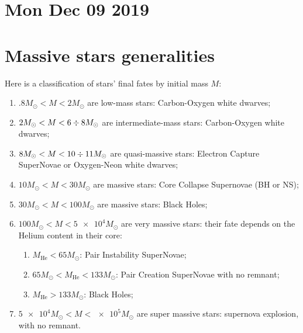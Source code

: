 \documentclass[main.tex]{subfiles}
\begin{document}
\section*{Mon Dec 09 2019}

\section{Massive stars generalities}


Here is a classification of stars' final fates by initial mass \(M\): 
\begin{enumerate}
    \item \(\num{.8} M_{\odot} < M < \num{2} M_{\odot}\) are low-mass stars: Carbon-Oxygen white dwarves;
    \item \(\num{2} M_{\odot} < M < 6 \divisionsymbol 8 M_{\odot}\) are intermediate-mass stars: Carbon-Oxygen white dwarves;
    \item \(\num{8} M_{\odot} < M < 10 \divisionsymbol 11 M_{\odot}\) are quasi-massive stars: Electron Capture SuperNovae or Oxygen-Neon white dwarves;
    \item \(10 M_{\odot} < M < 30 M_{\odot}\) are massive stars: Core Collapse Supernovae (BH or NS);
    \item \(30 M_{\odot} < M < 100 M_{\odot}\) are massive stars: Black Holes;
    \item \(100 M_{\odot} < M < \num{5e4} M_{\odot}\) are very massive stars: their fate depends on the Helium content in their core: \begin{enumerate}
        \item \(M _{\text{He}} < 65 M_{\odot}\): Pair Instability SuperNovae;
        \item \(65 M_{\odot} < M _{\text{He}} < 133 M_{\odot}\): Pair Creation SuperNovae with no remnant;
        \item \(M _{\text{He}} > 133 M_{\odot}\): Black Holes;
    \end{enumerate}
    \item \(\num{5e4} M_{\odot} < M < \num{e5} M_{\odot}\)  are super massive stars: supernova explosion, with no remnant.
\end{enumerate}

\end{document}
